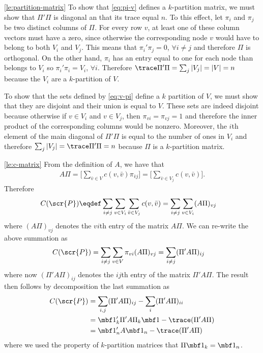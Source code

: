\documentclass[10pt]{article}
\begin{document}
\begin{proof-lemma}{\ref{le:partition-matrix}}
  To show that \eqref{eq:pi-v} defines a $k$-partition matrix, we must
  show that $\Pi'\Pi$ is diagonal an that its trace equal $n$. To this
  effect, let $\pi_i$ and $\pi_j$ be two distinct columns of $\Pi$. For
  every row $v$, at least one of these column vectors must have a
  zero, since otherwise the corresponding node $v$ would have to
  belong to both $V_i$ and $V_j$.  This means that $\pi_i'\pi_j=0$, $\forall i\neq
  j$ and therefore $\Pi$ is orthogonal. On the other hand, $\pi_i$ has an
  entry equal to one for each node than belongs to $V_i$ so
  $\pi_i'\pi_i=V_i$, $\forall i$. Therefore $\trace \Pi'\Pi=\sum_j |V_j|=|V|=n$ because
  the $V_i$ are a $k$-partition of $V$.

  \medskip
  
  To show that the sets defined by \eqref{eq:v-pi} define a $k$
  partition of $V$, we must show that they are disjoint and their
  union is equal to $V$. These sets are indeed disjoint because
  otherwise if $v\in V_i$ and $v\in V_j$, then $\pi_{v i}=\pi_{v j}=1$ and
  therefore the inner product of the corresponding columns would be
  nonzero. Moreover, the $i$th element of the main diagonal of $\Pi'\Pi$
  is equal to the number of ones in $V_i$ and therefore $\sum_j
  |V_j|=\trace \Pi'\Pi=n$ because $\Pi$ is a $k$-partition matrix. \frqed
\end{proof-lemma}

\begin{proof-lemma}{\ref{le:c-matrix}}
  From the definition of $A$, we have that
  \begin{align*}
    A \Pi = \Big[\sum_{\bar v\in V} c(v,\bar v)\pi_{\bar v j}\Big] = \Big[\sum_{\bar
      v\in V_j} c(v,\bar v)\Big].
  \end{align*}
  Therefore
  \begin{align*}
    C(\scr{P})&\eqdef \sum_{i\neq j} \sum_{v\in V_i} \sum_{\bar v\in V_j} c(v,\bar v)
    =\sum_{i\neq j} \sum_{v\in V_i} (A \Pi)_{v j}
  \end{align*}
  where $(A \Pi)_{v j}$ denotes the $v i$th entry of the matrix $A
  \Pi$. We can re-write the above summation as
  \begin{align*}
    C(\scr{P})
    &=\sum_{i\neq j} \sum_{v\in V} \pi_{v i}(A \Pi)_{v j}
    =\sum_{i\neq j}(\Pi'A \Pi)_{i j}
  \end{align*}
  where now $(\Pi'A \Pi)_{i j}$ denotes the $i j$th entry of the matrix
  $\Pi'A \Pi$. The result then follows by decomposition the last summation
  as
  \begin{align*}
    C(\scr{P})
    &=\sum_{i, j}(\Pi'A \Pi)_{i j}-\sum_{i}(\Pi'A \Pi)_{i i}\\
    &= \mbf 1_k' \Pi'A \Pi_k \mbf 1-\trace(\Pi'A \Pi)\\
    &= \mbf 1_n' A \mbf 1_n-\trace(\Pi'A \Pi)
  \end{align*}
  where we used the property of $k$-partition matrices that $\Pi \mbf
  1_k=\mbf 1_n$. \frQED
\end{proof-lemma}
\end{document}
